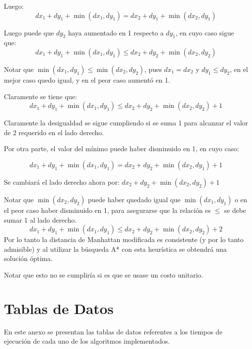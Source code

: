\documentclass[letter, titlepage, 10pt]{article}
\begin{document}
\begin{appendices}
Luego:
\begin{displaymath}
  dx_1 + dy_1 + \min{(dx_1,dy_1)} = dx_2 + dy_1 + \min{(dx_2,dy_1)}
\end{displaymath}

Luego puede que $dy_2$ haya aumentado en 1 respecto a $dy_1$, en cuyo caso sigue que:
\begin{displaymath}
  dx_1 + dy_1 + \min{(dx_1,dy_1)} \leq dx_2 + dy_2 + \min{(dx_2,dy_2)}
\end{displaymath}


Notar que $\min{(dx_1,dy_1)} \leq \min{(dx_2,dy_2)}$, pues $dx_1 = dx_2$ y $dy_1 \leq dy_2$, en el mejor caso quedo igual, y en el peor caso aumentó en 1. 

Claramente se tiene que:
\begin{displaymath}
  dx_1 + dy_1 + \min{(dx_1,dy_1)} \leq dx_2 + dy_2 + \min{(dx_2,dy_2)} + 1
\end{displaymath}

Claramente la desigualdad se sigue cumpliendo si se suma 1 para alcanzar el valor de 2 requerido en el lado derecho.

Por otra parte, el valor del mínimo puede haber disminuido en 1, en cuyo caso:

\begin{displaymath}
  dx_1 + dy_1 + \min{(dx_1,dy_1)} = dx_2 + dy_2 + \min{(dx_2,dy_1)} + 1
\end{displaymath}

Se cambiará el lado derecho ahora por: $dx_2 + dy_2 + \min{(dx_2,dy_2)} + 1$

Notar que $\min{(dx_2,dy_2)}$ puede haber quedado igual que $\min{(dx_1,dy_1)}$ o en el peor caso haber disminuido en 1, para asegurarse que la relación es $\leq$ se debe sumar 1 al lado derecho.
\begin{displaymath}
  dx_1 + dy_1 + \min{(dx_1,dy_1)} \leq dx_2 + dy_2 + \min{(dx_2,dy_2)} + 2
\end{displaymath}
Por lo tanto la distancia de Manhattan modificada es consistente (y por lo tanto admisible) y al utilizar la búsqueda A* con esta heurística se obtendrá una solución óptima.
    
Notar que esto no se cumpliría si es que se usase un costo unitario.

\newpage
  \section{Tablas de Datos}
  En este anexo se presentan las tablas de datos referentes a los tiempos de ejecución %
  de cada uno de los algoritmos implementados.

\end{appendices}
\end{document}
